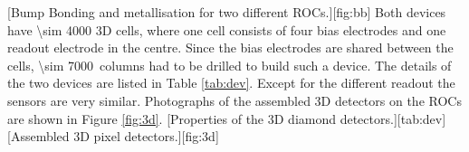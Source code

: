 [Bump Bonding and metallisation for two different \acp{ROC}.][fig:bb]
Both devices have \SI{\sim 4000}{} 3D cells, where one cell consists of four bias electrodes and one readout electrode in the centre. Since the bias electrodes are shared between the cells, \SI{\sim 7000}{columns} had to be drilled to build such a device. The details of the two devices are listed in Table \vref{tab:dev}. Except for the different readout the sensors are very similar. Photographs of the assembled 3D detectors on the \acp{ROC} are shown in Figure \ref{fig:3d}. 
\small{
  [Properties of the 3D diamond detectors.][tab:dev]}
[Assembled 3D pixel detectors.][fig:3d]